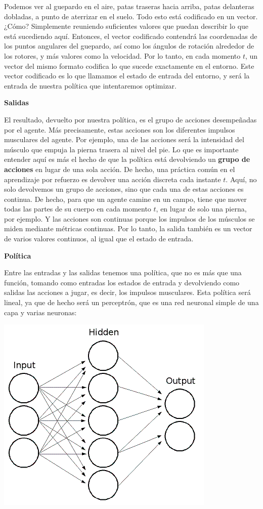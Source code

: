 \documentclass[]{book}
\begin{document}
Podemos ver al guepardo en el aire, patas traseras hacia arriba, patas delanteras dobladas, a punto de aterrizar en el suelo. Todo esto está codificado en un vector. ¿Cómo? Simplemente reuniendo suficientes valores que puedan describir lo que está sucediendo aquí. Entonces, el vector codificado contendrá las coordenadas de los puntos angulares del guepardo, así como los ángulos de rotación alrededor de los rotores, y más valores como la velocidad. Por lo tanto, en cada momento \(t\), un vector del mismo formato codifica lo que sucede exactamente en el entorno. Este vector codificado es lo que llamamos el estado de entrada del entorno, y será la entrada de nuestra política que intentaremos optimizar.

\textbf{Salidas}

El resultado, devuelto por nuestra política, es el grupo de acciones desempeñadas por el agente. Más precisamente, estas acciones son los diferentes impulsos musculares del agente. Por ejemplo, una de las acciones será la intensidad del músculo que empuja la pierna trasera al nivel del pie. Lo que es importante entender aquí es más el hecho de que la política está devolviendo un \textbf{grupo de acciones} en lugar de una sola acción. De hecho, una práctica común en el aprendizaje por refuerzo es devolver una acción discreta cada instante \(t\). Aquí, no solo devolvemos un grupo de acciones, sino que cada una de estas acciones es continua. De hecho, para que un agente camine en un campo, tiene que mover todas las partes de su cuerpo en cada momento \(t\), en lugar de solo una pierna, por ejemplo. Y las acciones son continuas porque los impulsos de los músculos se miden mediante métricas continuas. Por lo tanto, la salida también es un vector de varios valores continuos, al igual que el estado de entrada.

\textbf{Política}

Entre las entradas y las salidas tenemos una política, que no es más que una función, tomando como entradas los estados de entrada y devolviendo como salidas las acciones a jugar, es decir, los impulsos musculares. Esta política será lineal, ya que de hecho será un perceptrón, que es una red neuronal simple de una capa y varias neuronas:

\includegraphics{Images/Perceptron.png}
\end{document}
